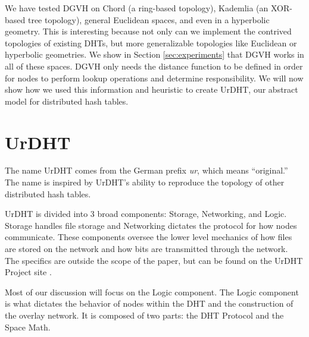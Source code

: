 We have tested DGVH on Chord (a ring-based topology), Kademlia (an XOR-based tree topology), general Euclidean spaces, and even in a hyperbolic geometry.
This is interesting because not only can we implement the contrived topologies of existing DHTs, but more generalizable topologies like Euclidean or hyperbolic geometries.
We show in Section \ref{sec:experiments} that DGVH works in all of these spaces.
DGVH only needs the distance function to be defined in order for nodes to perform lookup operations and determine responsibility.
%	
We will now show how we used this information and heuristic to create UrDHT, our abstract model for distributed hash tables.





\section{UrDHT}
\label{sec:urdht}


The name UrDHT comes from the German prefix \textit{ur}, which means ``original.'' 
The name is inspired by UrDHT's ability to reproduce the topology of other distributed hash tables.

UrDHT is divided into 3 broad components: Storage, Networking, and Logic.
Storage handles file storage and Networking dictates the protocol for how nodes communicate.
These components oversee the lower level mechanics of how files are stored on the network and how bits are transmitted through the network.
The specifics are outside the scope of the paper, but can be found on the UrDHT Project site \cite{urdht}.

Most of our discussion will focus on the Logic component.
The Logic component is what dictates the behavior of nodes within the DHT and the construction of the overlay network.
It is composed of two parts: the DHT Protocol and the Space Math.


